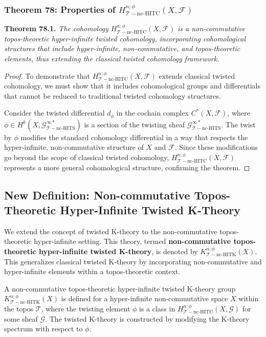 \documentclass{article}
\begin{document}
\subsubsection{Theorem 78: Properties of \(H_{\mathcal{T}-\text{nc-HITC}}^{n; \phi}(X, \mathcal{F})\)}
\textbf{Theorem 78.1.} \textit{The cohomology \(H_{\mathcal{T}-\text{nc-HITC}}^{n; \phi}(X, \mathcal{F})\) is a non-commutative topos-theoretic hyper-infinite twisted cohomology, incorporating cohomological structures that include hyper-infinite, non-commutative, and topos-theoretic elements, thus extending the classical twisted cohomology framework.}

\begin{proof}
To demonstrate that \(H_{\mathcal{T}-\text{nc-HITC}}^{n; \phi}(X, \mathcal{F})\) extends classical twisted cohomology, we must show that it includes cohomological groups and differentials that cannot be reduced to traditional twisted cohomology structures.

Consider the twisted differential \(d_{\phi}\) in the cochain complex \(C^*(X, \mathcal{F})\), where \(\phi \in H^k(X, \mathcal{G}_{\mathcal{T}-\text{nc-HITS}}^{\infty *})\) is a section of the twisting sheaf \(\mathcal{G}_{\mathcal{T}-\text{nc-HITS}}^{\infty *}\). The twist by \(\phi\) modifies the standard cohomology differential in a way that respects the hyper-infinite, non-commutative structure of \(X\) and \(\mathcal{F}\). Since these modifications go beyond the scope of classical twisted cohomology, \(H_{\mathcal{T}-\text{nc-HITC}}^{n; \phi}(X, \mathcal{F})\) represents a more general cohomological structure, confirming the theorem.
\end{proof}

\subsection{New Definition: Non-commutative Topos-Theoretic Hyper-Infinite Twisted K-Theory}
We extend the concept of twisted K-theory to the non-commutative topos-theoretic hyper-infinite setting. This theory, termed \textbf{non-commutative topos-theoretic hyper-infinite twisted K-theory}, is denoted by \(K_{\mathcal{T}-\text{nc-HITK}}^{n; \phi}(X)\). This generalizes classical twisted K-theory by incorporating non-commutative and hyper-infinite elements within a topos-theoretic context.

A non-commutative topos-theoretic hyper-infinite twisted K-theory group \(K_{\mathcal{T}-\text{nc-HITK}}^{n; \phi}(X)\) is defined for a hyper-infinite non-commutative space \(X\) within the topos \(\mathcal{T}\), where the twisting element \(\phi\) is a class in \(H_{\mathcal{T}-\text{nc-HITC}}^{n; \phi}(X, \mathcal{G})\) for some sheaf \(\mathcal{G}\). The twisted K-theory is constructed by modifying the K-theory spectrum with respect to \(\phi\).
\end{document}
